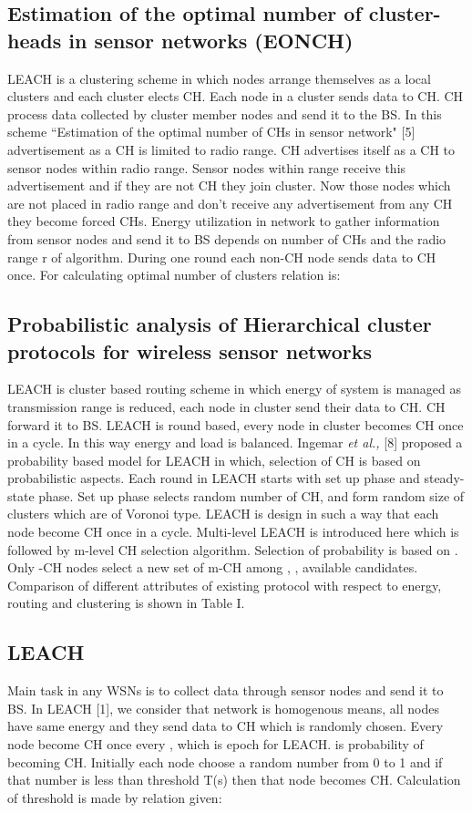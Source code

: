 \documentclass[10pt, conference, compsocconf]{IEEEtran}
\begin{document}
\subsection{Estimation of the optimal number of cluster-heads in sensor networks (EONCH)}
LEACH is a clustering scheme in which nodes arrange themselves as a local clusters and each cluster elects CH. Each node in a cluster sends data to CH.  CH process data collected by cluster member nodes and send it to the BS. In this scheme ``Estimation of the optimal number of CHs in sensor network" [5] advertisement as a CH is limited to radio range. CH advertises itself as a CH to sensor nodes within radio range. Sensor nodes within range receive this advertisement and if they are not CH they join  cluster. Now those nodes which are not placed in radio range and don't receive any advertisement from any CH they become forced CHs. Energy utilization in network to gather information from sensor nodes and send it to BS depends on number of CHs and the radio range r of algorithm. During one round each non-CH node sends data to CH once. For calculating optimal number of clusters relation is:



\subsection{Probabilistic analysis of Hierarchical cluster protocols for wireless sensor networks}
LEACH is cluster based routing scheme in which energy of  system is managed as transmission range is reduced, each node in cluster send their data to CH. CH forward it to BS. LEACH is round based, every node in cluster becomes CH once in a cycle. In this way energy and load is balanced. Ingemar \textit{et al.,} [8] proposed a probability based model for LEACH in which, selection of CH is based on probabilistic aspects. Each round in LEACH starts with set up phase and steady-state phase. Set up phase selects random number of CH, and form random size of clusters which are of Voronoi type. LEACH is design in such a way that each node become CH once in a cycle. Multi-level LEACH is introduced here which is followed by m-level CH selection algorithm. Selection of probability is based on . Only -CH nodes select a new set of m-CH among  , , available candidates. Comparison of different attributes of existing protocol with respect to energy, routing and clustering is shown in Table I.

\subsection{LEACH}
Main task in any WSNs is to collect data through sensor nodes and send it to BS. In LEACH [1], we consider that network is homogenous means, all nodes have same energy and they send data to CH which is randomly chosen. Every node become CH once every , which is epoch for LEACH.  is probability of becoming CH. Initially each node choose a random number from 0 to 1 and if that number is less than threshold T(s) then that node becomes CH. Calculation of threshold is made by relation given:
\end{document}

